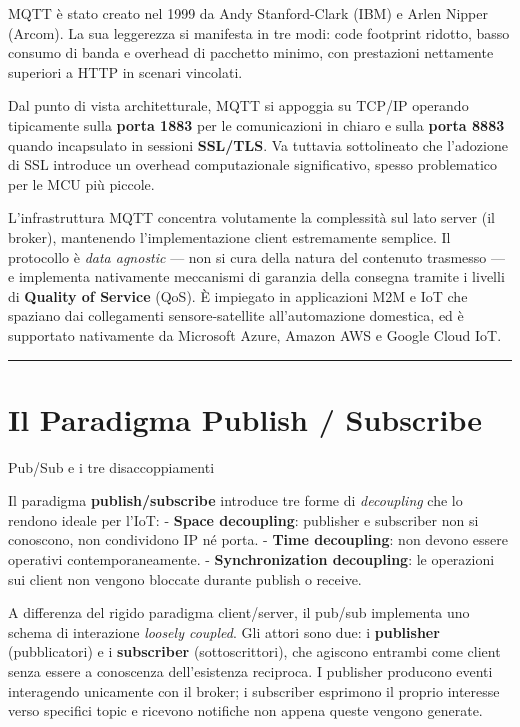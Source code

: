 \documentclass[
  italian,
  openany]{book}
\begin{document}
MQTT è stato creato nel 1999 da Andy Stanford-Clark (IBM) e Arlen Nipper
(Arcom). La sua leggerezza si manifesta in tre modi: code footprint
ridotto, basso consumo di banda e overhead di pacchetto minimo, con
prestazioni nettamente superiori a HTTP in scenari vincolati.

Dal punto di vista architetturale, MQTT si appoggia su TCP/IP operando
tipicamente sulla \textbf{porta 1883} per le comunicazioni in chiaro e
sulla \textbf{porta 8883} quando incapsulato in sessioni
\textbf{SSL/TLS}. Va tuttavia sottolineato che l'adozione di SSL
introduce un overhead computazionale significativo, spesso problematico
per le MCU più piccole.

L'infrastruttura MQTT concentra volutamente la complessità sul lato
server (il broker), mantenendo l'implementazione client estremamente
semplice. Il protocollo è \emph{data agnostic} --- non si cura della
natura del contenuto trasmesso --- e implementa nativamente meccanismi
di garanzia della consegna tramite i livelli di \textbf{Quality of
Service} (QoS). È impiegato in applicazioni M2M e IoT che spaziano dai
collegamenti sensore-satellite all'automazione domestica, ed è
supportato nativamente da Microsoft Azure, Amazon AWS e Google Cloud
IoT.

\begin{center}\rule{0.5\linewidth}{0.5pt}\end{center}

\section{Il Paradigma Publish /
Subscribe}\label{il-paradigma-publish-subscribe}

\begin{callouttip}{Pub/Sub e i tre disaccoppiamenti}

Il paradigma \textbf{publish/subscribe} introduce tre forme di
\emph{decoupling} che lo rendono ideale per l'IoT: - \textbf{Space
decoupling}: publisher e subscriber non si conoscono, non condividono IP
né porta. - \textbf{Time decoupling}: non devono essere operativi
contemporaneamente. - \textbf{Synchronization decoupling}: le operazioni
sui client non vengono bloccate durante publish o receive.

\end{callouttip}

A differenza del rigido paradigma client/server, il pub/sub implementa
uno schema di interazione \emph{loosely coupled}. Gli attori sono due: i
\textbf{publisher} (pubblicatori) e i \textbf{subscriber}
(sottoscrittori), che agiscono entrambi come client senza essere a
conoscenza dell'esistenza reciproca. I publisher producono eventi
interagendo unicamente con il broker; i subscriber esprimono il proprio
interesse verso specifici topic e ricevono notifiche non appena queste
vengono generate.
\end{document}
